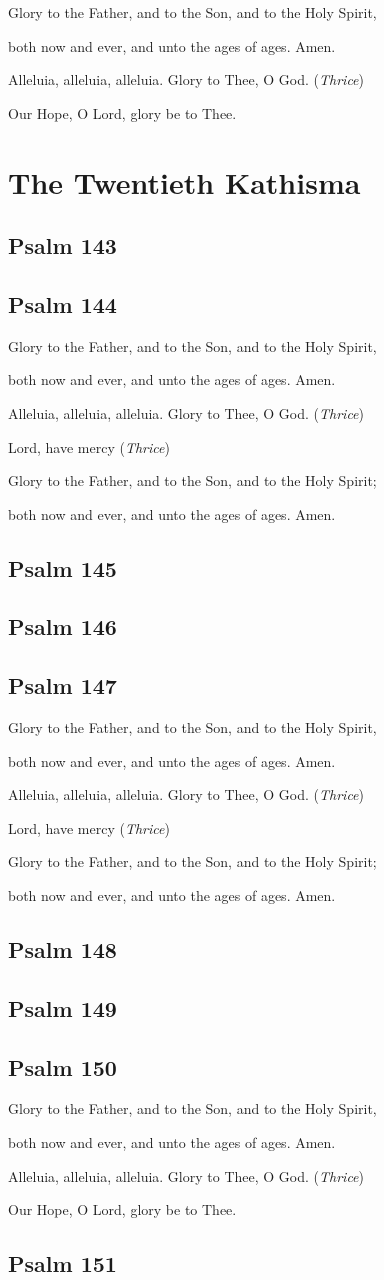 \documentclass[12pt,openany]{book}
\newcommand{\kathismabreak}{
  \medskip
  \begin{center}
  \begin{footnotesize}
  Glory to the Father, and to the Son, and to the Holy Spirit,
  
  both now and ever, and unto the ages of ages. Amen.

  Alleluia, alleluia, alleluia. Glory to Thee, O God. (\textit{Thrice})

  Lord, have mercy (\textit{Thrice})

  Glory to the Father, and to the Son, and to the Holy Spirit;
  
  both now and ever, and unto the ages of ages. Amen.
  \end{footnotesize}
  \end{center}
  \smallbreak
}
\newcommand{\kathismaend}{
  \medskip
  \begin{center}
  \begin{footnotesize}
  Glory to the Father, and to the Son, and to the Holy Spirit,
  
  both now and ever, and unto the ages of ages. Amen.

  Alleluia, alleluia, alleluia. Glory to Thee, O God. (\textit{Thrice})

  Our Hope, O Lord, glory be to Thee.
  \end{footnotesize}
  \end{center}
  \smallbreak
}
\begin{document}
\kathismaend

\chapter*{The Twentieth Kathisma}
\smallskip
\section{Psalm 143}

\smallskip
\section{Psalm 144}


\kathismabreak
\bigskip
\section{Psalm 145}

\smallskip
\pagebreak %
\section{Psalm 146}

\smallskip
\section{Psalm 147}


\kathismabreak
\smallskip
\section{Psalm 148}

\smallskip
\section{Psalm 149}

\smallskip
\section{Psalm 150}


\kathismaend
\smallskip
\section{Psalm 151}


\newpage

\thispagestyle{empty}
\ %

\newpage

\newpage
\pagestyle{plain}
\tableofcontents
\end{document}
